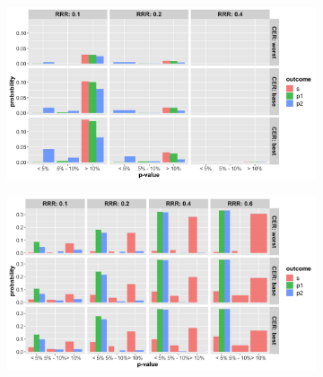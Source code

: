 \documentclass[]{article}
\begin{document}
\begin{figure}
\centering
  \caption{Probability that the p-value (from Fisher’s exact test) at termination of the trial is below 5\%, between 5\%
  and 10\% and greater than 10\% for cases where trial was (a) stopped for futility; (b) stopped for superiority. The
  rows represent the three control even rate scenarios and the columns present the relative risk reduction
  scenarios. Note: the denominator in each figure is the number of simulations (not the number of trials stopped for
  futility (a) or superiority (b), and thus, the proportions do not add up to 100\% within one figure. Further, (a) and
  (b) do not include simulations where the trial went to the max. allowed sample size. The bars should be interpreted
  with respect to the relative proportion that fit in each category.}
  \begin{subfigure}{0.8\textwidth}
    \centering
    \caption{}
    \includegraphics{../p1_plots/batch_size_nb_1000/pvalue_fut_p1.png}
  \end{subfigure}
  \bigbreak
  \begin{subfigure}{0.8\textwidth}
    \centering
    \caption{}
    \includegraphics{../p1_plots/batch_size_nb_1000/pvalue_sup_p1.png}
  \end{subfigure}
\end{figure}
\end{document}

